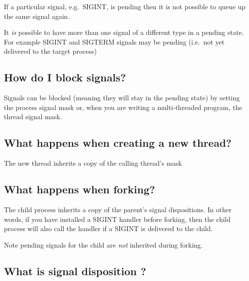 If a particular signal, e.g.~SIGINT, is pending then it is not possible
to queue up the same signal again.

It \emph{is} possible to have more than one signal of a different type
in a pending state. For example SIGINT and SIGTERM signals may be
pending (i.e.~not yet delivered to the target process)

\subsection{How do I block signals?}\label{how-do-i-block-signals}

Signals can be blocked (meaning they will stay in the pending state) by
setting the process signal mask or, when you are writing a
multi-threaded program, the thread signal mask.

\subsection{What happens when creating a new
thread?}\label{what-happens-when-creating-a-new-thread}

The new thread inherits a copy of the calling thread's mask

\begin{Shaded}
\begin{Highlighting}[]
\end{Highlighting}
\end{Shaded}

\subsection{What happens when forking?}\label{what-happens-when-forking}

The child process inherits a copy of the parent's signal dispositions.
In other words, if you have installed a SIGINT handler before forking,
then the child process will also call the handler if a SIGINT is
delivered to the child.

Note pending signals for the child are \emph{not} inherited during
forking.

\subsection{What is signal disposition
?}\label{what-is-signal-disposition}


